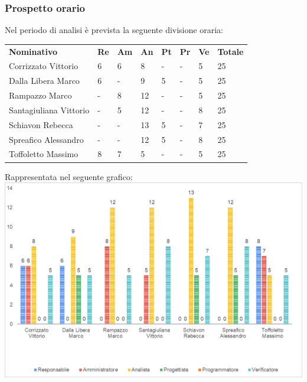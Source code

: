 		\subsubsection{Prospetto orario}
		Nel periodo di analisi è prevista la seguente divisione oraria:
		\begin{longtable} {				
				>{}p{40mm}  
				>{}p{8mm}
				>{}p{8mm}
				>{}p{8mm}
				>{}p{8mm}
				>{}p{8mm}
				>{}p{8mm}
				>{}p{12mm}				
			}			
			\rowcolor{gray!50}
			\textbf{Nominativo} & \textbf{Re} & \textbf{Am} & \textbf{An} & \textbf{Pt} & \textbf{Pr} & \textbf{Ve} & \textbf{Totale}	\TBstrut \\ [2mm]
			Corrizzato Vittorio & 6 & 6 & 8 & - & - & 5 & 25 \TBstrut \\ [2mm]
			Dalla Libera Marco & 6 & - & 9 & 5 & - & 5 & 25 \TBstrut \\ [2mm]
			Rampazzo Marco & - & 8 & 12 & - & - & 5 & 25 \TBstrut \\ [2mm]
			Santagiuliana Vittorio & - & 5 & 12 & - & - & 8 & 25 \TBstrut \\ [2mm]
			Schiavon Rebecca & - & - & 13 & 5 & - & 7 & 25 \TBstrut \\ [2mm]
			Spreafico Alessandro & - & - & 12 & 5 & - & 8 & 25 \TBstrut \\ [2mm]
			Toffoletto Massimo & 8 & 7 & 5 & - & - & 5 & 25 \TBstrut \\ [2mm]
		\end{longtable}
		Rappresentata nel seguente grafico: \\
		\includegraphics[width=\linewidth]{./img/Grafici/1.png}
	
